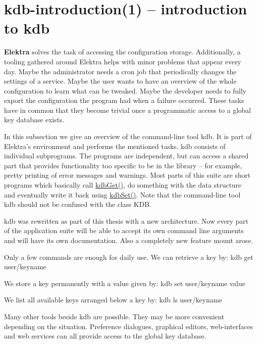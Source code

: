 \section*{kdb-\/introduction(1) -- introduction to kdb }

{\bfseries Elektra} solves the task of accessing the configuration storage. Additionally, a tooling gathered around Elektra helps with minor problems that appear every day. Maybe the administrator needs a cron job that periodically changes the settings of a service. Maybe the user wants to have an overview of the whole configuration to learn what can be tweaked. Maybe the developer needs to fully export the configuration the program had when a failure occurred. These tasks have in common that they become trivial once a programmatic access to a global key database exists.

In this subsection we give an overview of the command-\/line tool {\ttfamily kdb}. It is part of Elektra's environment and performs the mentioned tasks. {\ttfamily kdb} consists of individual subprograms. The programs are independent, but can access a shared part that provides functionality too specific to be in the library -- for example, pretty printing of error messages and warnings. Most parts of this suite are short programs which basically call {\ttfamily \hyperlink{group__kdb_ga28e385fd9cb7ccfe0b2f1ed2f62453a1}{kdb\+Get()}}, do something with the data structure and eventually write it back using {\ttfamily \hyperlink{group__kdb_ga11436b058408f83d303ca5e996832bcf}{kdb\+Set()}}. Note that the command-\/line tool {\ttfamily kdb} should not be confused with the class {\ttfamily K\+D\+B}.

{\ttfamily kdb} was rewritten as part of this thesis with a new architecture. Now every part of the application suite will be able to accept its own command line arguments and will have its own documentation. Also a completely new feature {\ttfamily mount} arose.

Only a few commands are enough for daily use. We can retrieve a key by\+: {\ttfamily kdb get user/keyname}

We store a key permanently with a value given by\+: {\ttfamily kdb set user/keyname value}

We list all available keys arranged below a key by\+: {\ttfamily kdb ls user/keyname}

Many other tools beside {\ttfamily kdb} are possible. They may be more convenient depending on the situation. Preference dialogues, graphical editors, web-\/interfaces and web services can all provide access to the global key database. 